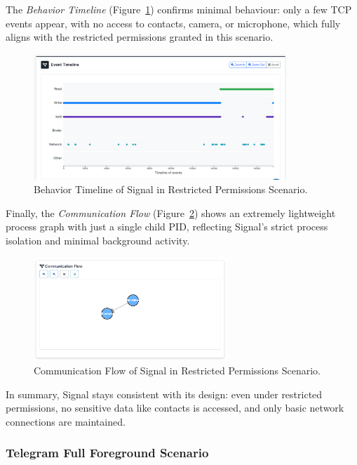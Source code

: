 \documentclass[a4paper,12pt]{report}
\begin{document}
The \textit{Behavior Timeline} (Figure~\ref{fig:signal-none-behav}) confirms minimal behaviour: only a few TCP events appear, with no access to contacts, camera, or microphone, which fully aligns with the restricted permissions granted in this scenario.

\begin{figure}[H]
    \centering
    \includegraphics[width=0.85\textwidth]{signal-none-behav.png}
    \caption{Behavior Timeline of Signal in Restricted Permissions Scenario.}
    \label{fig:signal-none-behav}
\end{figure}

Finally, the \textit{Communication Flow} (Figure~\ref{fig:signal-none-flow}) shows an extremely lightweight process graph with just a single child PID, reflecting Signal’s strict process isolation and minimal background activity.

\begin{figure}[H]
    \centering
    \includegraphics[width=0.65\textwidth]{signal-none-flow.png}
    \caption{Communication Flow of Signal in Restricted Permissions Scenario.}
    \label{fig:signal-none-flow}
\end{figure}

In summary, Signal stays consistent with its design: even under restricted permissions, no sensitive data like contacts is accessed, and only basic network connections are maintained.



\subsubsection{Telegram Full Foreground Scenario}
\end{document}
